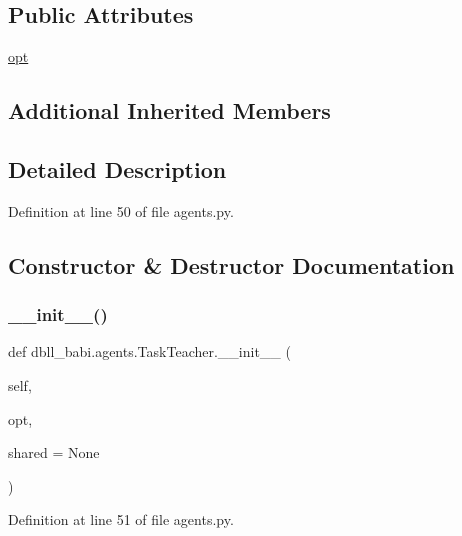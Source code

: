 \subsection*{Public Attributes}
\begin{DoxyCompactItemize}
\item 
\hyperlink{classdbll__babi_1_1agents_1_1TaskTeacher_abe6872d5eda75ca8a15ecf4785086c48}{opt}
\end{DoxyCompactItemize}
\subsection*{Additional Inherited Members}


\subsection{Detailed Description}


Definition at line 50 of file agents.\+py.



\subsection{Constructor \& Destructor Documentation}
\mbox{\label{classdbll__babi_1_1agents_1_1TaskTeacher_a98b7cf17bf8248372e08889b3fe30ac5}} 
\subsubsection{\texorpdfstring{\+\_\+\+\_\+init\+\_\+\+\_\+()}{\_\_init\_\_()}}
{\footnotesize\ttfamily def dbll\+\_\+babi.\+agents.\+Task\+Teacher.\+\_\+\+\_\+init\+\_\+\+\_\+ (\begin{DoxyParamCaption}\item[{}]{self,  }\item[{}]{opt,  }\item[{}]{shared = {\ttfamily None} }\end{DoxyParamCaption})}



Definition at line 51 of file agents.\+py.




